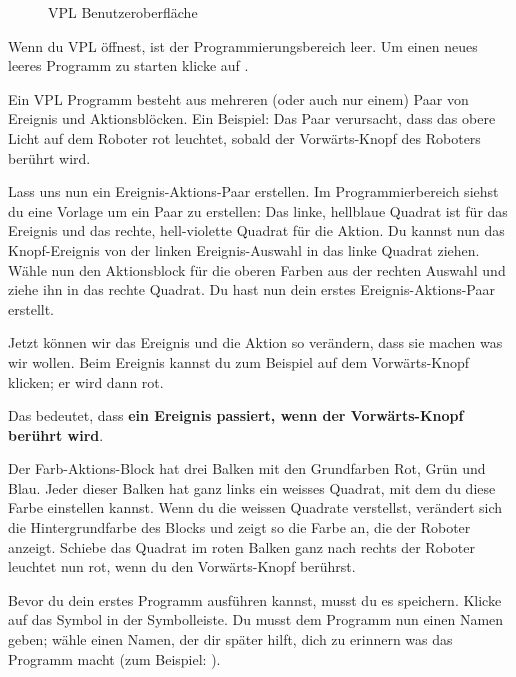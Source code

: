 \begin{figure}[hbt]
\caption{VPL Benutzeroberfläche}\label{fig.gui}
\end{figure}



Wenn du VPL öffnest, ist der Programmierungsbereich leer. Um einen neues leeres
Programm zu starten klicke auf .

Ein VPL Programm besteht aus mehreren (oder auch nur einem) Paar von Ereignis
und Aktionsblöcken. Ein Beispiel: Das Paar  verursacht, dass das
obere Licht auf dem Roboter rot leuchtet, sobald der Vorwärts-Knopf des
Roboters berührt wird.


Lass uns nun ein Ereignis-Aktions-Paar erstellen. Im Programmierbereich siehst
du eine Vorlage um ein Paar zu erstellen:  Das
linke, hellblaue Quadrat ist für das Ereignis und das rechte, hell-violette
Quadrat für die Aktion. Du kannst nun das Knopf-Ereignis 
von der linken Ereignis-Auswahl in das linke Quadrat ziehen. Wähle nun den
Aktionsblock für die oberen Farben  aus der rechten
Auswahl und ziehe ihn in das rechte Quadrat. Du hast nun dein erstes
Ereignis-Aktions-Paar erstellt.

Jetzt können wir das Ereignis und die Aktion so verändern, dass sie machen was
wir wollen. Beim Ereignis kannst du zum Beispiel auf dem Vorwärts-Knopf
klicken; er wird dann rot.

Das bedeutet, dass \textbf{ein Ereignis passiert, wenn der Vorwärts-Knopf
berührt wird}.

Der Farb-Aktions-Block hat drei Balken mit den Grundfarben Rot, Grün und Blau.
Jeder dieser Balken hat ganz links ein weisses Quadrat, mit dem du diese Farbe
einstellen kannst. Wenn du die weissen Quadrate verstellst, verändert sich die
Hintergrundfarbe des Blocks und zeigt so die Farbe an, die der Roboter anzeigt.
Schiebe das Quadrat im roten Balken ganz nach rechts  der Roboter
leuchtet nun rot, wenn du den Vorwärts-Knopf berührst. 


Bevor du dein erstes Programm ausführen kannst, musst du es speichern. Klicke
auf das Symbol  in der Symbolleiste. Du musst dem Programm nun
einen Namen geben; wähle einen Namen, der dir später hilft, dich zu erinnern
was das Programm macht (zum Beispiel: ).

